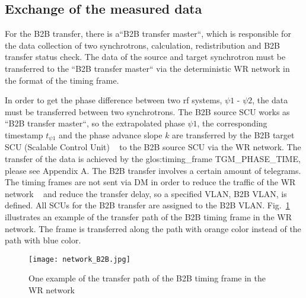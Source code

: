 \subsection{Exchange of the measured data}

For the B2B transfer, there is a“B2B transfer master“, which is responsible for the data collection of two synchrotrons, calculation, redistribution and B2B transfer status check. The data of the source and target synchrotron must be transferred to the ``B2B transfer master`` via the deterministic WR network in the format of the timing frame.
 
In order to get the phase difference between two rf systems, $\psi1$ - $\psi2$, the data must be transferred between two synchrotrons. The B2B source SCU works as ``B2B transfer master``, so the extrapolated phase $\psi1$, the corresponding timestamp $t_{\psi1}$ and the phase advance slope $k$ are transferred by the B2B target SCU (Scalable Control Unit) ~\cite{beck_new_2012, thieme_scu_2013} to the B2B source SCU via the WR network. The transfer of the data is achieved by the \gls{glos:timing_frame} TGM\_PHASE\_TIME, please see Appendix A. The B2B transfer involves a certain amount of telegrams. The timing frames are not sent via DM in order to reduce the traffic of the WR network ~\cite{bai_concept_2016} and reduce the transfer delay, so a specified VLAN, B2B VLAN, is defined. All SCUs for the B2B transfer are assigned to the B2B VLAN. Fig.~\ref{network_B2B} illustrates an example of the transfer path of the B2B timing frame in the WR network. The frame is transferred along the path with orange color instead of the path with blue color. 
 \begin{figure}[!htb]
   \centering   
   \texttt{[image: network\_B2B.jpg]}
   \caption{One example of the transfer path of the B2B timing frame in the WR network}
   \label{network_B2B}
\end{figure}
